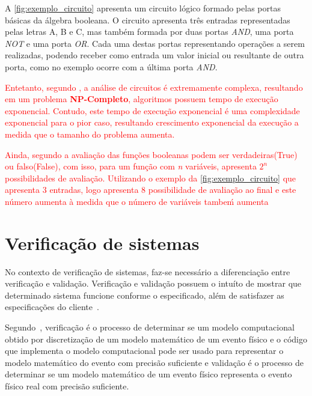 A \autoref{fig:exemplo_circuito} apresenta um circuito lógico formado pelas portas básicas da álgebra booleana. O circuito apresenta três entradas representadas pelas letras A, B e C, mas também formada por duas portas \textit{AND}, uma porta \textit{NOT} e uma porta \textit{OR}. Cada uma destas portas representando operações a serem realizadas, podendo receber como entrada um valor inicial ou resultante de outra porta, como no exemplo ocorre com a última porta \textit{AND}.

\par
\textcolor{red}{Entetanto, segundo \cite{kropf2013introduction}, a análise de circuitos é extremamente complexa, resultando em um problema \textbf{NP-Completo}, algoritmos possuem tempo de execução exponencial. Contudo, este tempo de execução exponencial é uma complexidade exponencial para o pior caso, resultando crescimento exponencial da execução a medida que o tamanho do problema aumenta.}

\par
\textcolor{red}{Ainda, segundo \cite{kropf2013introduction} a avaliação das funções booleanas podem ser verdadeiras(True) ou falso(False), com isso, para um função com \textit{n} variáveis, apresenta $2^{n}$ possibilidades de avaliação. Utilizando o exemplo da \autoref{fig:exemplo_circuito} que apresenta 3 entradas, logo apresenta 8 possibilidade de avaliação ao final e este número aumenta à medida que o número de variáveis tambeḿ aumenta}
 

\section{Verificação de sistemas}
 No contexto de verificação de sistemas, faz-se necessário a diferenciação entre verificação e validação. Verificação e validação possuem o intuíto de mostrar que determinado sistema funcione conforme o especificado, além de satisfazer as especificações do cliente~\cite{sommerville2011engenharia}. 

\par
Segundo~\cite{sargent2005verification}, verificação é o processo de determinar se um modelo computacional obtido por discretização de um modelo matemático de um evento físico e o código que implementa o modelo computacional pode ser usado para representar o modelo matemático do evento com precisão suficiente e validação é o processo de determinar se um modelo matemático de um evento físico representa o evento físico real com precisão suficiente.

